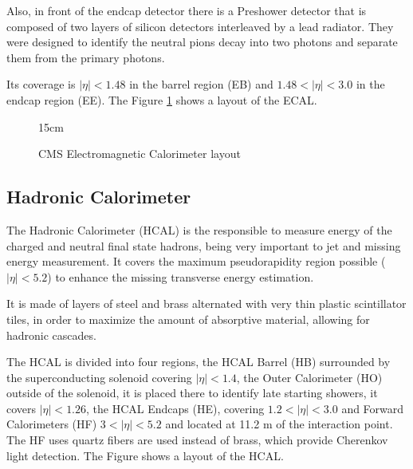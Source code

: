 Also, in front of the endcap detector there is a Preshower detector that is composed of two layers of silicon detectors interleaved by a lead radiator. They were designed to identify the neutral pions decay into two photons and separate them from the primary photons.

Its coverage is $|\eta| < 1.48$ in the barrel region (EB) and  $1.48 < |\eta| < 3.0$ in the endcap region (EE). The Figure \ref{fig:ecal_layout} shows a layout of the ECAL.

\begin{figure}[!htm]{15cm} %
\caption{CMS Electromagnetic Calorimeter layout}%
\label{fig:ecal_layout}
\end{figure}

\subsection{Hadronic Calorimeter}

The Hadronic Calorimeter (HCAL) is the responsible to measure energy of the charged and neutral final state hadrons, being very important to jet and missing energy measurement. It covers the maximum pseudorapidity region possible ($|\eta| < 5.2$) to enhance the missing transverse energy estimation.

It is made of layers of steel and brass alternated with very thin plastic scintillator tiles, in order to maximize the amount of absorptive material, allowing for hadronic cascades.

The HCAL is divided into four regions, the HCAL Barrel (HB) surrounded by the superconducting solenoid covering $|\eta| < 1.4$, the Outer Calorimeter (HO) outside of the solenoid, it is placed there to identify late starting showers, it covers $|\eta| < 1.26$, the HCAL Endcaps (HE), covering $1.2 < |\eta| < 3.0$ and Forward Calorimeters (HF) $3 < |\eta| < 5.2$ and located at 11.2 m of the interaction point. The HF uses quartz fibers are used instead of brass, which provide Cherenkov light detection. The Figure shows a layout of the HCAL.

